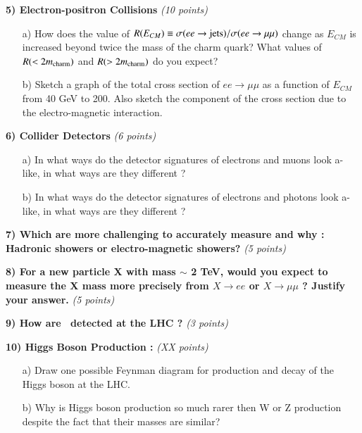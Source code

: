 {\textbf{5) Electron-positron Collisions } \hfill \textit{(10 points)}\\
\begin{itemize}
\item[a)]{
How does the value of $R(E_{CM}) \equiv \sigma(ee\rightarrow \textrm{jets})/\sigma(ee\rightarrow \mu\mu)$ change as $E_{CM}$ is increased beyond twice the mass of the charm quark? 
What values of $R(< 2 m_{\textrm{charm}})$ and $R(> 2 m_{\textrm{charm}})$ do you expect?
\vspace*{1in}
}

\item[b)]{Sketch a graph of the total cross section of $ee\rightarrow\mu\mu$ as a function of $E_{CM}$ from 40 GeV to 200. 
Also sketch the component of the cross section due to the electro-magnetic interaction.
\vspace*{1in}
}
\end{itemize}


\textbf{6) Collider Detectors  } \hfill \textit{(6 points)}\\
\begin{itemize}
\item[a)]{ In what ways do the detector signatures of electrons and muons look a-like, in what ways are they different ?
\vspace*{1in}
}
\item[b)]{ In what ways do the detector signatures of electrons and photons look a-like, in what ways are they different ?
\vspace*{1in}
}
\end{itemize}
        

\textbf{7) 
Which are more challenging to accurately measure and why : Hadronic showers or electro-magnetic showers?  } \hfill \textit{(5 points)}\\
\vspace*{1.5in}

\textbf{8) For a new particle X with mass $\sim$ 2 TeV,  would you expect to measure the X mass more precisely from $X\rightarrow ee$ or $X \rightarrow \mu\mu$ ? Justify your answer.} \hfill \textit{(5 points)}\\
\vspace*{1.0in}


\textbf{9) How are \nus\ detected at the LHC ?} \hfill \textit{(3 points)}\\
\vspace*{1.0in}


\textbf{10) Higgs Boson Production : } \hfill \textit{(XX points)}\\
\begin{itemize}
\item[a)]{ Draw one possible Feynman diagram for production and decay of the Higgs boson at the LHC.}
\vspace*{1in}
\item[b)]{ Why is Higgs boson production so much rarer then W or Z production despite the fact that their masses are similar?    }
\vspace*{1in}
\end{itemize}


}
